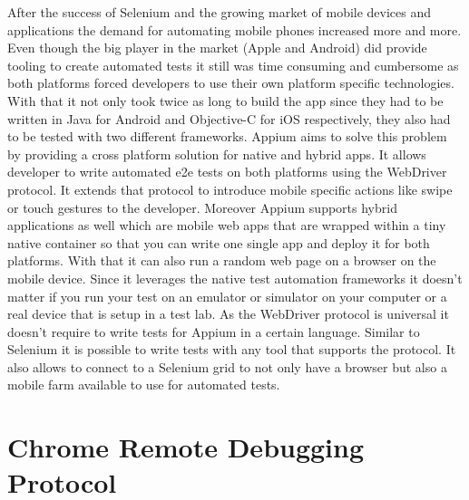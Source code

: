 After the success of Selenium and the growing market of mobile devices and applications the
demand for automating mobile phones increased more and more. Even though the big player in
the market (Apple and Android) did provide tooling to create automated tests it still was
time consuming and cumbersome as both platforms forced developers to use their own platform
specific technologies. With that it not only took twice as long to build the app since they had
to be written in Java for Android and Objective-C for iOS respectively, they also had to be
tested with two different frameworks. Appium aims to solve this problem by providing a cross
platform solution for native and hybrid apps. It allows developer to write automated e2e tests
on both platforms using the WebDriver protocol. It extends that protocol to introduce mobile
specific actions like swipe or touch gestures to the developer. Moreover Appium supports hybrid
applications as well which are mobile web apps that are wrapped within a tiny native container
so that you can write one single app and deploy it for both platforms. With that it can also
run a random web page on a browser on the mobile device. Since it leverages the native test
automation frameworks it doesn't matter if you run your test on an emulator or simulator on your
computer or a real device that is setup in a test lab. As the WebDriver protocol is universal
it doesn't require to write tests for Appium in a certain language. Similar to Selenium it is
possible to write tests with any tool that supports the protocol. It also allows to connect
to a Selenium grid to not only have a browser but also a mobile farm available to use for
automated tests.

\section{Chrome Remote Debugging Protocol\label{sec:remotedebuggingprotocol}}

